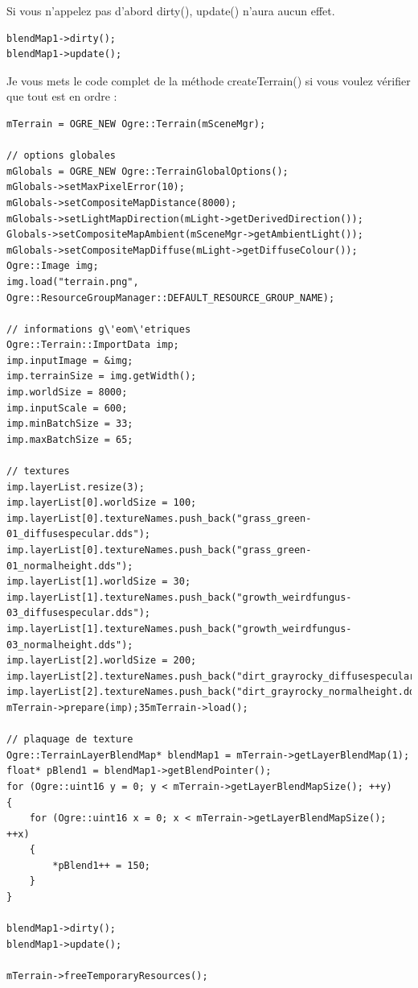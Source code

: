 \documentclass[10pt,a4paper]{report}
\begin{document}
Si vous n'appelez pas d'abord dirty(), update() n'aura aucun effet.

\begin{lstlisting}[caption={Mise \`a jour de la Blend Map}]
blendMap1->dirty();
blendMap1->update();
\end{lstlisting}

Je vous mets le code complet de la m\'ethode createTerrain() si vous voulez v\'erifier que tout est en ordre :

\begin{lstlisting}[caption={createTerrain (code complet)}]
mTerrain = OGRE_NEW Ogre::Terrain(mSceneMgr);

// options globales
mGlobals = OGRE_NEW Ogre::TerrainGlobalOptions();
mGlobals->setMaxPixelError(10);
mGlobals->setCompositeMapDistance(8000);
mGlobals->setLightMapDirection(mLight->getDerivedDirection());
Globals->setCompositeMapAmbient(mSceneMgr->getAmbientLight());
mGlobals->setCompositeMapDiffuse(mLight->getDiffuseColour());
Ogre::Image img;
img.load("terrain.png", Ogre::ResourceGroupManager::DEFAULT_RESOURCE_GROUP_NAME);

// informations g\'eom\'etriques
Ogre::Terrain::ImportData imp;
imp.inputImage = &img;
imp.terrainSize = img.getWidth();
imp.worldSize = 8000;
imp.inputScale = 600;
imp.minBatchSize = 33;
imp.maxBatchSize = 65;

// textures
imp.layerList.resize(3);
imp.layerList[0].worldSize = 100;
imp.layerList[0].textureNames.push_back("grass_green-01_diffusespecular.dds");
imp.layerList[0].textureNames.push_back("grass_green-01_normalheight.dds");
imp.layerList[1].worldSize = 30;
imp.layerList[1].textureNames.push_back("growth_weirdfungus-03_diffusespecular.dds");
imp.layerList[1].textureNames.push_back("growth_weirdfungus-03_normalheight.dds");
imp.layerList[2].worldSize = 200;
imp.layerList[2].textureNames.push_back("dirt_grayrocky_diffusespecular.dds");
imp.layerList[2].textureNames.push_back("dirt_grayrocky_normalheight.dds");
mTerrain->prepare(imp);35mTerrain->load();

// plaquage de texture
Ogre::TerrainLayerBlendMap* blendMap1 = mTerrain->getLayerBlendMap(1);
float* pBlend1 = blendMap1->getBlendPointer();
for (Ogre::uint16 y = 0; y < mTerrain->getLayerBlendMapSize(); ++y)
{
    for (Ogre::uint16 x = 0; x < mTerrain->getLayerBlendMapSize(); ++x)
    {
        *pBlend1++ = 150;
    }
}

blendMap1->dirty();
blendMap1->update();

mTerrain->freeTemporaryResources();
\end{lstlisting}
\end{document}
